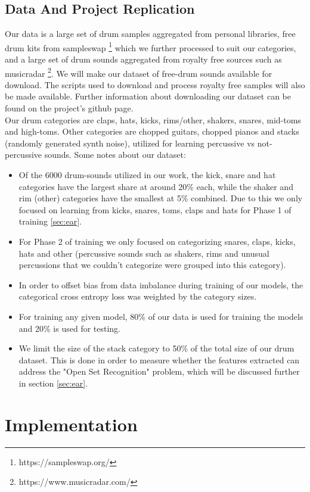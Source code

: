 \documentclass{nime-alternate} %
\begin{document}
\subsection{Data And Project Replication}
\label{data}
Our data is a large set of drum samples aggregated from personal libraries, free drum kits from sampleswap \footnote{https://sampleswap.org/} which we further processed to suit our categories, and a large set of drum sounds aggregated from royalty free sources such as musicradar \footnote{https://www.musicradar.com/}. We will make our dataset of free-drum sounds available for download. The scripts used to download and process royalty free samples will also be made available. Further information about downloading our dataset can be found on the project's github page. \\
Our drum categories are claps, hats, kicks, rims/other, shakers, snares, mid-toms and high-toms. Other categories are chopped guitars, chopped pianos and stacks (randomly generated synth noise), utilized for learning percussive vs not-percussive sounds. Some notes about our dataset:
\begin{itemize}
\item Of the 6000 drum-sounds utilized in our work, the kick, snare and hat categories have the largest share at around 20\% each, while the shaker and rim (other) categories have the smallest at 5\% combined. Due to this we only focused on learning from kicks, snares, toms, claps and hats for Phase 1 of training \ref{sec:ear}.
\item For Phase 2 of training we only focused on categorizing snares, claps, kicks, hats and other (percussive sounds such as shakers, rims and unusual percussions that we couldn't categorize were grouped into this category). 
\item In order to offset bias from data imbalance during training of our models, the categorical cross entropy loss was weighted by the category sizes. 
\item For training any given model, 80\% of our data is used for training the models and 20\% is used for testing. 
\item We limit the size of the stack category to 50\% of the total size of our drum dataset. This is done in order to measure whether the features extracted can address the "Open Set Recognition" problem, which will be discussed further in section \ref{sec:ear}.
\end{itemize}
\section{Implementation}
\label{impl}
\end{document}
